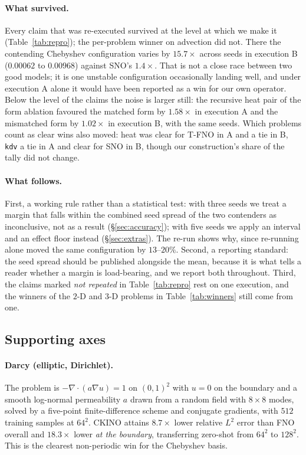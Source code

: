 \documentclass[11pt]{article}
\theoremstyle{definition}
\theoremstyle{remark}
\newcommand{\ckino}{\textsc{CKINO}}
\begin{document}
\paragraph{What survived.} Every claim that was re-executed survived at the
level at which we make it (Table~\ref{tab:repro}); the per-problem winner on
advection did not. There the contending Chebyshev configuration varies by
$15.7\times$ across seeds in execution B ($0.00062$ to $0.00968$) against SNO's
$1.4\times$. That is not a close race between two good models; it is one
unstable configuration occasionally landing well, and under execution A alone it
would have been reported as a win for our own operator. Below the level of the
claims the noise is larger still: the recursive heat pair of the form ablation
favoured the matched form by $1.58\times$ in execution A and the mismatched form
by $1.02\times$ in execution B, with the same seeds. Which problems count as
clear wins also moved: heat was clear for T-FNO in A and a tie in B, \texttt{kdv} a tie in
A and clear for SNO in B, though our construction's share of the tally did not
change.

\paragraph{What follows.} First, a working rule rather than a statistical test:
with three seeds we treat a margin that falls within the combined seed spread of
the two contenders as inconclusive, not as a result (\S\ref{sec:accuracy}); with
five seeds we apply an interval and an effect floor instead
(\S\ref{sec:extras}). The re-run shows why, since re-running alone moved the
same configuration by $13$--$20\%$. Second, a reporting standard: the seed spread
should be published alongside the mean, because it is what tells a reader whether
a margin is load-bearing, and we report both throughout. Third, the claims marked
\emph{not repeated} in Table~\ref{tab:repro} rest on one execution, and the
winners of the $2$-D and $3$-D problems in Table~\ref{tab:winners} still come
from one.

\subsection{Supporting axes}
\label{sec:support}

\paragraph{Darcy (elliptic, Dirichlet).} The problem is $-\nabla\!\cdot(a\nabla
u)=1$ on $(0,1)^2$ with $u=0$ on the boundary and a smooth log-normal permeability
$a$ drawn from a random field with $8\times8$ modes, solved by a five-point
finite-difference scheme and conjugate gradients, with $512$ training samples at
$64^2$. \ckino{} attains $8.7\times$ lower
relative $L^2$ error than FNO overall and $18.3\times$ lower \emph{at the
boundary}, transferring zero-shot from $64^2$ to $128^2$. This is the clearest
non-periodic win for the Chebyshev basis.
\end{document}
